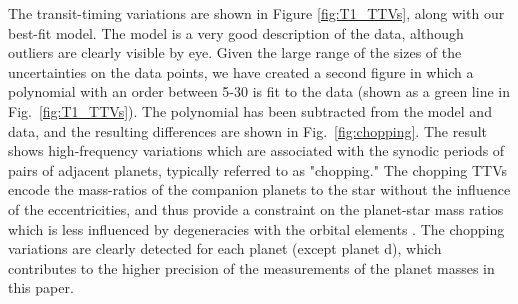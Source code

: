 \documentclass[twocolumn]{aastex63}
\begin{document}
The transit-timing variations are shown in Figure \ref{fig:T1_TTVs}, along
with our best-fit model.  The model is a very good description of the data,
although outliers are clearly visible by eye.  Given the large range of
the sizes of the uncertainties on the data points, we have created a
second figure in which a polynomial with an order between 5-30 is fit to
the data (shown as a green line in Fig.\ \ref{fig:T1_TTVs}).  The polynomial
has been subtracted from the model and data, and the resulting differences 
are shown in Fig.\ \ref{fig:chopping}.  The result shows high-frequency variations which are
associated with the synodic periods of pairs of adjacent planets, typically
referred to as "chopping."  The chopping TTVs encode the mass-ratios of
the companion planets to the star without the influence of the eccentricities,
and thus provide a constraint on the planet-star mass ratios which is less
influenced by degeneracies with the orbital elements \citep{Deck2015}.  The 
chopping variations are clearly detected for each planet
(except planet d), which contributes to the higher
precision of the measurements of the planet
masses in this paper.
\end{document}
